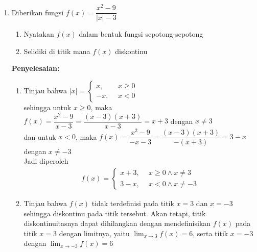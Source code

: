 \documentclass{article}
\begin{document}
\begin{enumerate}
\begin{enumerate}
    \end{enumerate}
    \item Diberikan fungsi $f(x)=\dfrac{x^2-9}{|x|-3}$
    \begin{enumerate}
        \item Nyatakan $f(x)$ dalam bentuk fungsi sepotong-sepotong
        \item Selidiki di titik mana $f(x)$ diskontinu
    \end{enumerate}
    \textbf{Penyelesaian:}
    \begin{enumerate}
        \item Tinjau bahwa $|x| = \begin{cases} x, ~~&x\geq 0\\ -x, ~~&x<0\end{cases}$\\ sehingga untuk $x\geq 0$, maka $f(x)=\dfrac{x^2-9}{x-3} = \dfrac{(x-3)(x+3)}{x-3} = x+3$ dengan $x\neq 3$\\
        dan untuk $x<0$, maka $f(x)=\dfrac{x^2-9}{-x-3} = \dfrac{(x-3)(x+3)}{-(x+3)} = 3-x$ dengan $x\neq -3$\\
        Jadi diperoleh 
        \begin{align*}
        f(x) = \begin{cases} x+3, ~~ & x\geq 0 \wedge x\neq 3\\ 3-x, ~~ & x<0 \wedge x\neq -3 \end{cases}
        \end{align*}
        \item Tinjau bahwa $f(x)$ tidak terdefinisi pada titik $x=3$ dan $x=-3$ sehingga diskontinu pada titik tersebut. Akan tetapi, titik diskontinuitasnya dapat dihilangkan dengan mendefinisikan $f(x)$ pada titik $x=3$ dengan limitnya, yaitu $\displaystyle \lim_{x\rightarrow 3} f(x) = 6$, serta titik $x=-3$ dengan $\displaystyle \lim_{x\rightarrow -3} f(x) = 6$
    \end{enumerate}
\end{enumerate}
\end{document}
